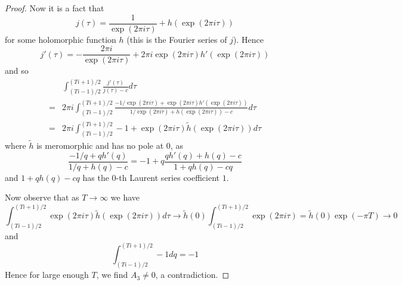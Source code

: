 \documentclass{scrartcl}
\theoremstyle{definition}
\begin{document}
\begin{proof}
    Now it is a fact that
    \begin{equation*}
        j(\tau) = \frac 1 {\exp(2\pi i \tau)} + h(\exp(2\pi i \tau))
    \end{equation*}
    for some holomorphic function $h$ (this is the Fourier series of $j$).
    Hence
    \begin{equation*}
        j'(\tau) = -\frac {2\pi i} {\exp(2\pi i \tau)} + 2\pi i \exp(2\pi i \tau) h'(\exp(2\pi i \tau))
    \end{equation*}
    and so
    \begin{align*}
        &\int_{(Ti - 1)/2}^{(Ti + 1)/2} \frac {j'(\tau)} {j(\tau) - c} d\tau \\
        =& 2\pi i \int_{(Ti - 1)/2}^{(Ti + 1)/2} \frac {-1/\exp(2\pi i \tau) + \exp(2\pi i \tau)h'(\exp(2\pi i \tau))} {1/\exp(2\pi i \tau) + h(\exp(2\pi i \tau)) - c} d\tau \\
        =& 2\pi i \int_{(Ti - 1)/2}^{(Ti + 1)/2} -1 + \exp(2\pi i \tau)\tilde{h}(\exp(2\pi i \tau)) d\tau
    \end{align*}
    where $\tilde{h}$ is meromorphic and has no pole at $0$, as
    \begin{equation*}
        \frac {-1/q + qh'(q)} {1/q + h(q) - c} = -1 + q \frac {qh'(q) + h(q) - c} {1 + qh(q) - cq}
    \end{equation*}
    and $1 + qh(q) - cq$ has the $0$-th Laurent series coefficient $1$.

    Now observe that as $T \to \infty$ we have
    \begin{equation*}
        \int_{(Ti - 1)/2}^{(Ti + 1)/2} \exp(2\pi i \tau)\tilde{h}(\exp(2\pi i \tau)) d\tau \to \tilde{h}(0) \int_{(Ti - 1)/2}^{(Ti + 1)/2} \exp(2\pi i\tau) = \tilde{h}(0) \exp(-\pi T) \to 0
    \end{equation*}
    and
    \begin{equation*}
        \int_{(Ti - 1)/2}^{(Ti + 1)/2} -1 dq = -1
    \end{equation*}
    Hence for large enough $T$, we find $A_3 \neq 0$, a contradiction.
\end{proof}
\end{document}
